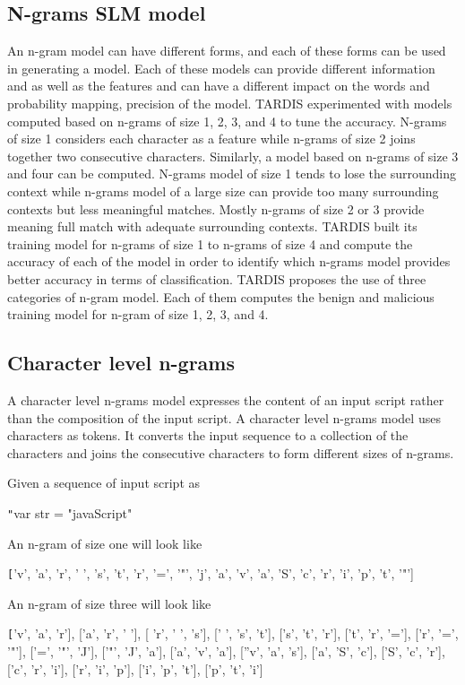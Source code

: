 \subsection{N-grams SLM model} \label{n-grams}

An n-gram model can have different forms, and each of these forms can be used in generating a model. Each of these models can provide different information and as well as the features and can have a different impact on the words and probability mapping, precision of the model. TARDIS experimented with models computed based on n-grams of size 1, 2, 3, and 4 to tune the accuracy. N-grams of size 1 considers each character as a feature while n-grams of size 2 joins together two consecutive characters. Similarly, a model based on n-grams of size 3 and four can be computed.  N-grams model of size 1 tends to lose the surrounding context while n-grams model of a large size can provide too many surrounding contexts but less meaningful matches. Mostly n-grams of size 2 or 3 provide meaning full match with adequate surrounding contexts. TARDIS built its training model for n-grams of size 1 to n-grams of size 4 and compute the accuracy of each of the model in order to identify which n-grams model provides better accuracy in terms of classification. TARDIS proposes the use of three categories of n-gram model. Each of them computes the benign and malicious training model for n-gram of size 1, 2, 3, and 4. 


\subsection{Character level n-grams}

A character level n-grams model expresses the content of an input script rather than the composition of the input script. A character level n-grams model uses characters as tokens. It converts the input sequence to a collection of the characters and joins the consecutive characters to form different sizes of n-grams.

Given a sequence of input script as

\texttt"var str = "javaScript"

An n-gram of size one will look like

\texttt['v', 'a', 'r', ' ', 's', 't', 'r', '=', '"', 'j', 'a', 'v', 'a', 'S', 'c', 'r', 'i', 'p', 't', '"']

An n-gram of size three will look like

\texttt['v', 'a', 'r'], ['a', 'r', ' '], [ 'r', ' ', 's'], [' ', 's', 't'], ['s', 't', 'r'], ['t', 'r', '='], 
['r', '=', '"'], ['=', '"', 'J'], ['"', 'J', 'a'], ['a', 'v', 'a'], [''v', 'a', 's'], ['a', 'S', 'c'], ['S', 'c', 'r'], ['c', 'r', 'i'], ['r', 'i', 'p'], ['i', 'p', 't'], ['p', 't', 'i']

